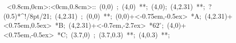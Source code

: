%

\hbox{
\xy    <0.8cm,0cm>:<0cm,0.8cm>::
       (0,0) ; (4,0) **\dir{-};
       (4,0); (4,2.31) **\dir{-}; ?(0.5)*^!/8pt/{21}; 
       (4,2.31) ; (0,0) **\dir{-};  
       (0,0)+<-0.75em,-0.5ex> *{A};
       (4,2.31)+<0.75em,0.5ex> *{B};
       (4,2.31)+<-0.7em,-2.7ex> *\hbox{$62^\circ$};
       (4,0)+<0.75em,-0.5ex> *{C};
	(3.7,0) ; (3.7,0.3) **\dir{-}; (4,0.3) **\dir{-};
       \endxy}
	   

